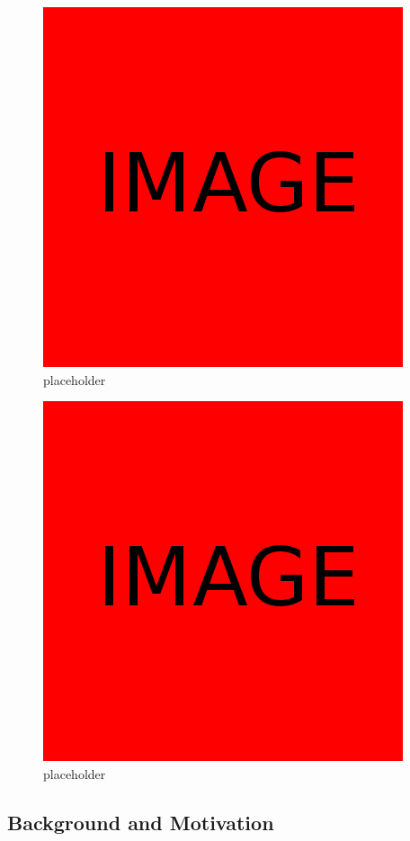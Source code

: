 \documentclass{article}
\begin{document}
\begin{figure}[h]
  \centering
  \includegraphics[scale=0.3]{placeholder}
  \caption{placeholder}
  \label{fig:placeholder1}
\end{figure}
\begin{figure}[h]
  \centering
  \includegraphics[scale=0.3]{placeholder}
  \caption{placeholder}
  \label{fig:placeholder2}
\end{figure}

\subsection{Background and Motivation}
\end{document}
